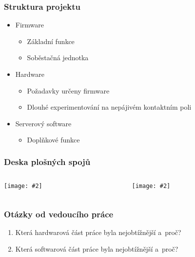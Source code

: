 \documentclass[
    utf8,
    aspectratio=169,
    17pt,  %
]{beamer}
\newcommand{\fullsizegraphics}[2][]{%
    \centering%
    \texttt{[image: \#2]}%
}
\begin{document}
\begin{frame}
    \frametitle{Struktura projektu}
    \begin{itemize}
        \item Firmware
            \begin{itemize}
                \item Základní funkce
                \item Soběstačná jednotka
            \end{itemize}
        \item Hardware
            \begin{itemize}
                \item Požadavky určeny firmware
                \item Dlouhé experimentování na nepájivém kontaktním poli
            \end{itemize}
        \item Serverový software
            \begin{itemize}
                \item Doplňkové funkce
            \end{itemize}
    \end{itemize}
\end{frame}

\begin{frame}
    \frametitle{Deska plošných spojů}
    \begin{columns}
        \begin{column}{0.5\textwidth}
            \fullsizegraphics{PCB-top}
        \end{column}
        \begin{column}{0.5\textwidth}
            \fullsizegraphics{PCB-bot}
        \end{column}
    \end{columns}

\end{frame}

\begin{frame}
    \frametitle{Otázky od vedoucího práce}
    \begin{enumerate}
        \item Která hardwarová část práce byla nejobtížnější a~proč?
        \item Která softwarová část práce byla nejobtížnější a~proč?
    \end{enumerate}
\end{frame}
\end{document}
